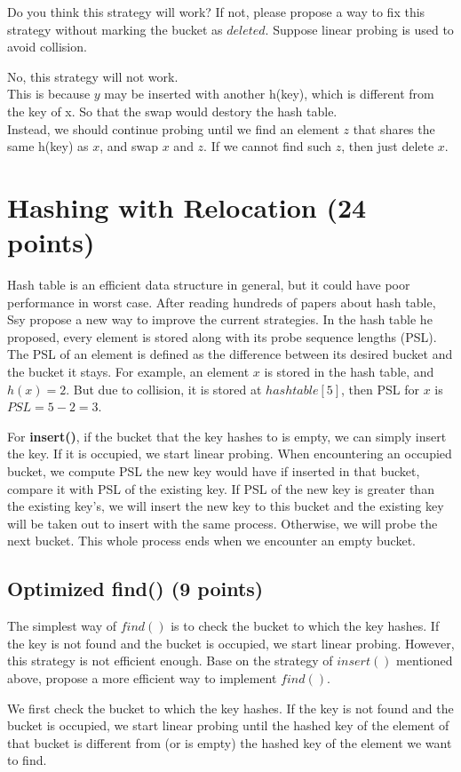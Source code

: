 \documentclass[11pt]{exam}
\begin{document}
Do you think this strategy will work? If not, please propose a way to fix this strategy without marking the bucket as $deleted$. Suppose linear probing is used to avoid collision.
\begin{solution}
    No, this strategy will not work. \\
    This is because $y$ may be inserted with another h(key), which is different from the key of x. So that the 
    swap would destory the hash table. \\
    Instead, we should continue probing until we find an element $z$ that shares the same h(key) as $x$, and swap 
    $x$ and $z$. If we cannot find such $z$, then just delete $x$.
\end{solution}

\section{Hashing with Relocation (24 points)}
Hash table is an efficient data structure in general, but it could have poor performance in worst case. After reading hundreds of papers about hash table, Ssy propose a new way to improve the current strategies. In the hash table he proposed, every element is stored along with its probe sequence lengths (PSL). The PSL of an element is defined as the difference between its desired bucket and the bucket it stays. For example, an element $x$ is stored in the hash table, and $h(x) = 2$. But due to collision, it is stored at $hashtable[5]$, then PSL for $x$ is $PSL = 5 - 2 = 3$. \par
For \textbf{insert()}, if the bucket that the key hashes to is empty, we can simply insert the key. If it is occupied, we start linear probing. When encountering an occupied bucket, we compute PSL the new key would have if inserted in that bucket, compare it with PSL of the existing key. If PSL of the new key is greater than the existing key's, we will insert the new key to this bucket and the existing key will be taken out to insert with the same process. Otherwise, we will probe the next bucket. This whole process ends when we encounter an empty bucket. 
\subsection{Optimized find() (9 points)}
The simplest way of $find()$ is to check the bucket to which the key hashes. If the key is not found and the bucket is occupied, we start linear probing. However, this strategy is not efficient enough. Base on the strategy of $insert()$ mentioned above, propose a more efficient way to implement $find()$.
\begin{solution}
    We first  check the bucket to which the key hashes. If the key is 
not found and the bucket is occupied, we start linear probing until the 
hashed key of the element of that bucket is different from (or is empty) the hashed key of the element
we want to find.
\end{solution}
\end{document}
